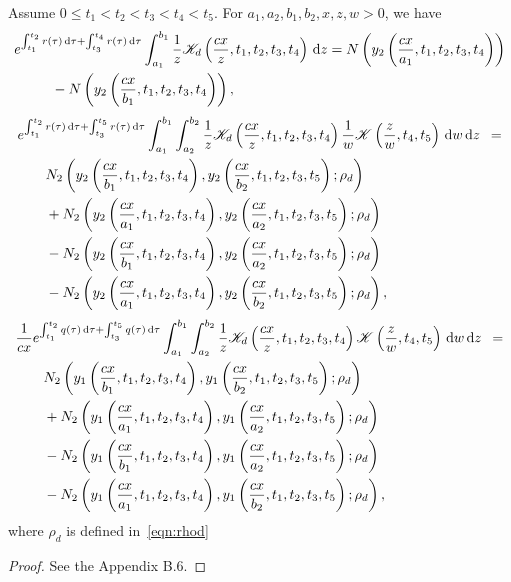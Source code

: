 	\begin{corollary}
		\label{cor:2}
		Assume $0 \leq t_1 < t_2 < t_3 < t_4 < t_5$. For $a_1,a_2,b_1,b_2, x,z,w > 0$, we have
		\begin{equation}
			\label{eqn:cor2a}
			\begin{split}
			&e^{\int_{t_1}^{t_2} r(\tau) \, \mathrm d\tau + \int_{t_3}^{t_4} r(\tau) \,\mathrm d\tau}\int_{a_1}^{b_1} \frac{1}{z}\mathscr K_d\left(\frac{cx}{z}, t_1, t_2, t_3, t_4\right) \, \mathrm d z =  N\left(y_2\left( \frac{cx}{a_1}, t_1, t_2, t_3, t_4 \right) \right) \\
			&\qquad \ \ - N\left(y_2\left( \frac{cx}{b_1}, t_1, t_2, t_3, t_4 \right) \right),
			\end{split}
		\end{equation}
		\begin{equation}
			\label{eqn:cor2b}
		\begin{split}
			&e^{\int_{t_1}^{t_2} r(\tau) \, \mathrm d\tau + \int_{t_3}^{t_5} r(\tau) \,\mathrm d\tau}\int_{a_1}^{b_1}\int_{a_2}^{b_2} \frac{1}{z}\mathscr K_d\left(\frac{cx}{z}, t_1, t_2, t_3, t_4\right)\frac{1}{w}\mathscr K\left( \frac{z}{w}, t_4, t_5 \right) \, \mathrm d w \, \mathrm d z \enskip = \\
			& \qquad N_2\left( y_2\left( \frac{cx}{b_1}, t_1, t_2, t_3, t_4 \right), y_2\left( \frac{cx}{b_2}, t_1, t_2, t_3, t_5 \right); \rho_d  \right) \\
			& \qquad + N_2\left( y_2\left( \frac{cx}{a_1}, t_1, t_2, t_3, t_4 \right), y_2\left( \frac{cx}{a_2}, t_1, t_2, t_3, t_5 \right); \rho_d  \right) \\
		&\qquad - N_2\left( y_2\left( \frac{cx}{b_1}, t_1, t_2, t_3, t_4 \right), y_2\left( \frac{cx}{a_2}, t_1, t_2, t_3, t_5 \right); \rho_d  \right) \\
		&\qquad - N_2\left( y_2\left( \frac{cx}{a_1}, t_1, t_2, t_3, t_4 \right), y_2\left( \frac{cx}{b_2}, t_1, t_2, t_3, t_5 \right); \rho_d  \right),
		\end{split}
		\end{equation}
				\begin{equation}
			\label{eqn:cor2c}
		\begin{split}
			&\frac{1}{cx}e^{\int_{t_1}^{t_2} q(\tau) \, \mathrm d\tau + \int_{t_3}^{t_5} q(\tau) \,\mathrm d\tau}\int_{a_1}^{b_1}\int_{a_2}^{b_2} \frac{1}{z}\mathscr K_d\left(\frac{cx}{z}, t_1, t_2, t_3, t_4\right)\mathscr K\left( \frac{z}{w}, t_4, t_5 \right) \, \mathrm d w \, \mathrm d z \enskip = \\
			& \qquad N_2\left( y_1\left( \frac{cx}{b_1}, t_1, t_2, t_3, t_4 \right), y_1\left( \frac{cx}{b_2}, t_1, t_2, t_3, t_5 \right); \rho_d  \right) \\
			& \qquad + N_2\left( y_1\left( \frac{cx}{a_1}, t_1, t_2, t_3, t_4 \right), y_1\left( \frac{cx}{a_2}, t_1, t_2, t_3, t_5 \right); \rho_d  \right) \\
		&\qquad - N_2\left( y_1\left( \frac{cx}{b_1}, t_1, t_2, t_3, t_4 \right), y_1\left( \frac{cx}{a_2}, t_1, t_2, t_3, t_5 \right); \rho_d  \right) \\
		&\qquad - N_2\left( y_1\left( \frac{cx}{a_1}, t_1, t_2, t_3, t_4 \right), y_1\left( \frac{cx}{b_2}, t_1, t_2, t_3, t_5 \right); \rho_d  \right),
		\end{split}
		\end{equation}
where $\rho_d$ is defined in~\eqref{eqn:rhod}
	\end{corollary}
\begin{proof}
	See the Appendix B.6.
\end{proof}